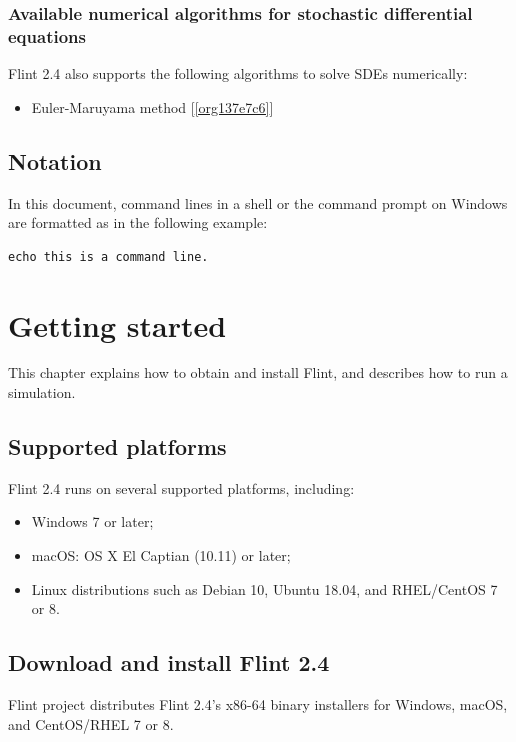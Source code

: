 \documentclass[a4paper,10pt]{report}
\begin{document}
\subsection{Available numerical algorithms for stochastic differential equations}
\label{sec:org884c17a}
Flint 2.4 also supports the following algorithms to solve SDEs
numerically:

\begin{itemize}
\item Euler-Maruyama method [\ref{org137e7c6}]
\end{itemize}


\section{Notation}
\label{sec:org54e5e3b}
In this document, command lines in a shell or the command prompt on Windows are
formatted as in the following example:
\begin{verbatim}
echo this is a command line.
\end{verbatim}


\chapter{Getting started}
\label{sec:org9188855}

This chapter explains how to obtain and install Flint, and describes how to run
a simulation.

\section{Supported platforms}
\label{sec:org6c6f582}
Flint 2.4 runs on several supported platforms, including:

\begin{itemize}
\item Windows 7 or later;
\item macOS: OS X El Captian (10.11) or later;
\item Linux distributions such as Debian 10, Ubuntu 18.04, and RHEL/CentOS 7 or 8.
\end{itemize}


\section{Download and install Flint 2.4}
\label{sec:org318c846}
Flint project distributes Flint 2.4's x86-64 binary installers for Windows,
macOS, and CentOS/RHEL 7 or 8.
\end{document}
